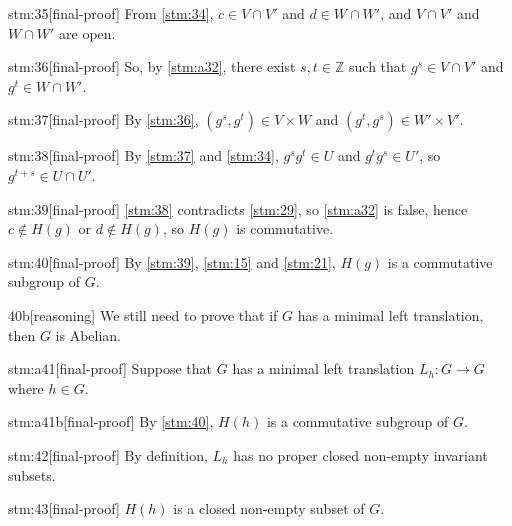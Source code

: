 \documentclass{article}
\begin{document}
\begin{stm}{stm:35}[final-proof]
From \ref{stm:34}, $c \in V \cap V'$ and $d \in W \cap W'$, and $V \cap V'$ and $W \cap W'$ are open.
\end{stm}

\begin{stm}{stm:36}[final-proof]
So, by \ref{stm:a32}, there exist $s,t \in \mathbb{Z}$ such that $g^s \in V \cap V'$ and $g^t \in W \cap W'$.
\end{stm}

\begin{stm}{stm:37}[final-proof]
By \ref{stm:36}, $(g^s, g^t) \in V \times W$ and $(g^t, g^s) \in W' \times V'$.
\end{stm}

\begin{stm}{stm:38}[final-proof]
By \ref{stm:37} and \ref{stm:34}, $g^s g^t \in U$ and $g^t g^s \in U'$, so $g^{t+s} \in U \cap U'$.
\end{stm}

\begin{stm}{stm:39}[final-proof]
\ref{stm:38} contradicts \ref{stm:29}, so \ref{stm:a32} is false, hence $c \notin H(g)$ or $d \notin H(g)$, so $H(g)$ is commutative.
\end{stm}

\begin{stm}{stm:40}[final-proof]
By \ref{stm:39}, \ref{stm:15} and \ref{stm:21}, $H(g)$ is a commutative subgroup of $G$.
\end{stm}

\begin{stm}{40b}[reasoning]
We still need to prove that if $G$ has a minimal left translation, then $G$ is Abelian.
\end{stm}

\begin{stm}{stm:a41}[final-proof]
Suppose that $G$ has a minimal left translation $L_h : G \to G$ where $h \in G$.
\end{stm}

\begin{stm}{stm:a41b}[final-proof]
By \ref{stm:40}, $H(h)$ is a commutative subgroup of $G$.
\end{stm}

\begin{stm}{stm:42}[final-proof]
By definition, $L_h$ has no proper closed non-empty invariant subsets.
\end{stm}

\begin{stm}{stm:43}[final-proof]
$H(h)$ is a closed non-empty subset of $G$.
\end{stm}
\end{document}
